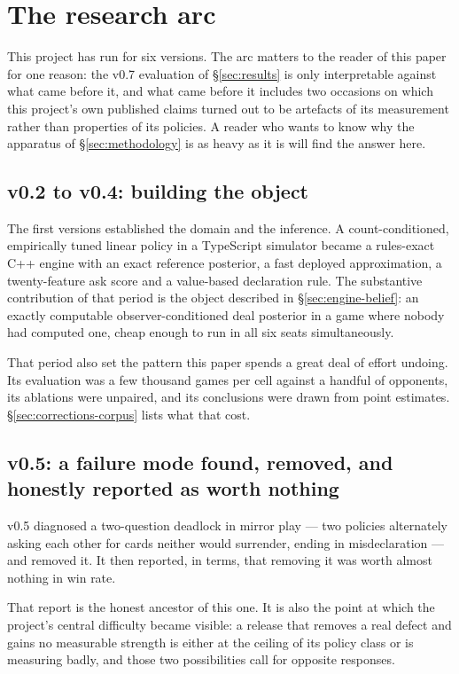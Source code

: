 \section{The research arc}
\label{sec:arc}

This project has run for six versions. The arc matters to the reader of this paper for one reason:
the v0.7 evaluation of \S\ref{sec:results} is only interpretable against what came before it, and
what came before it includes two occasions on which this project's own published claims turned out
to be artefacts of its measurement rather than properties of its policies. A reader who wants to
know why the apparatus of \S\ref{sec:methodology} is as heavy as it is will find the answer here.

\subsection{v0.2 to v0.4: building the object}
\label{sec:arc-early}

The first versions established the domain and the inference. A count-conditioned, empirically tuned
linear policy in a TypeScript simulator became a rules-exact C++ engine with an exact reference
posterior, a fast deployed approximation, a twenty-feature ask score and a value-based declaration
rule. The substantive contribution of that period is the object described in
\S\ref{sec:engine-belief}: an exactly computable observer-conditioned deal posterior in a game where
nobody had computed one, cheap enough to run in all six seats simultaneously.

That period also set the pattern this paper spends a great deal of effort undoing. Its evaluation
was a few thousand games per cell against a handful of opponents, its ablations were unpaired, and
its conclusions were drawn from point estimates. \S\ref{sec:corrections-corpus} lists what that cost.

\subsection{v0.5: a failure mode found, removed, and honestly reported as worth nothing}
\label{sec:arc-vfive}

v0.5 diagnosed a two-question deadlock in mirror play --- two policies alternately asking each other
for cards neither would surrender, ending in misdeclaration --- and removed it. It then reported, in
terms, that removing it was worth almost nothing in win rate.

That report is the honest ancestor of this one. It is also the point at which the project's central
difficulty became visible: a release that removes a real defect and gains no measurable strength is
either at the ceiling of its policy class or is measuring badly, and those two possibilities call
for opposite responses.

